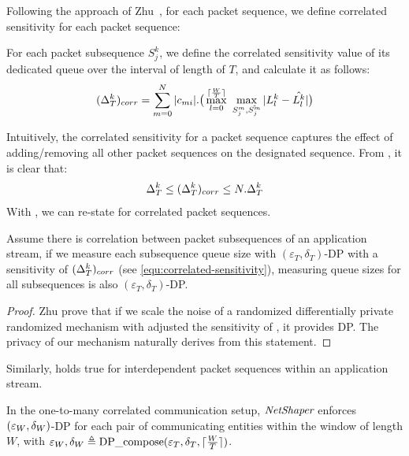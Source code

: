 Following the approach of Zhu~\etal, for each packet sequence, we define correlated sensitivity for each packet sequence:
\begin{definition}\label{def:correlated-sensitivity} 
  For each packet subsequence $S_{j}^k$, we define the correlated sensitivity value of its dedicated queue over the interval of length of $T$, and calculate it as follows:
  \begin{equation}\label{equ:correlated-sensitivity}
    (\Delta_T^k)_{corr} = \sum_{m=0}^{N} |c_{mi}|. \big( \max_{l = 0}^{\lceil \frac{W}{T} \rceil}~\max_{S_{j}^m,
    \hat{S_{j}^m}} | L_{l}^k - \hat{L_{l}^k} | \big) 
  \end{equation}
\end{definition}
\noindent Intuitively, the correlated sensitivity for a packet sequence captures the effect of adding/removing all other packet sequences on the designated sequence.
From , it is clear that:
\begin{equation*}
  \Delta_T^k \leq (\Delta_T^k)_{corr} \leq N.\Delta_T^k
\end{equation*} 
\noindent
With , we can re-state  for correlated packet sequences.
\begin{proposition}\label{prop:dependent-subsequence}
  Assume there is correlation between packet subsequences of an application stream, if we measure each subsequence queue size with $(\varepsilon_T, \delta_T)$-DP with a sensitivity of $(\Delta_T^k)_{corr}$ (see \ref{equ:correlated-sensitivity}), measuring queue sizes for all subsequences is also $(\varepsilon_T, \delta_T)$-DP.  
\end{proposition}
\begin{proof}
  Zhu prove that if we scale the noise of a randomized differentially private randomized mechanism with adjusted the sensitivity of , it provides DP. The privacy of our mechanism naturally derives from this statement. 
\end{proof}
\noindent Similarly,  holds true for interdependent packet sequences within an application stream. 
\begin{proposition}\label{prop:dependent-stream-privacy}
  In the one-to-many correlated communication setup, {$\textit{NetShaper}$} enforces $(\varepsilon_{W}, \delta_{W})$-DP for each pair of communicating entities within the window of length $W$, with $\varepsilon_{W}, \delta_{W} \triangleq
  \textrm{DP\_compose}(\varepsilon_T, \delta_T, \lceil \frac{W}{T} \rceil)$.
\end{proposition}

